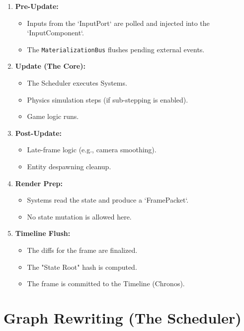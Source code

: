 \begin{enumerate}
    \item \textbf{Pre-Update:}
        \begin{itemize}
            \item Inputs from the `InputPort` are polled and injected into the `InputComponent`.
            \item The \texttt{MaterializationBus} flushes pending external events.
        \end{itemize}
    \item \textbf{Update (The Core):}
        \begin{itemize}
            \item The Scheduler executes Systems.
            \item Physics simulation steps (if sub-stepping is enabled).
            \item Game logic runs.
        \end{itemize}
    \item \textbf{Post-Update:}
        \begin{itemize}
            \item Late-frame logic (e.g., camera smoothing).
            \item Entity despawning cleanup.
        \end{itemize}
    \item \textbf{Render Prep:}
        \begin{itemize}
            \item Systems read the state and produce a `FramePacket`.
            \item No state mutation is allowed here.
        \end{itemize}
    \item \textbf{Timeline Flush:}
        \begin{itemize}
            \item The diffs for the frame are finalized.
            \item The "State Root" hash is computed.
            \item The frame is committed to the Timeline (Chronos).
        \end{itemize}
\end{enumerate}

\section{Graph Rewriting (The Scheduler)}

